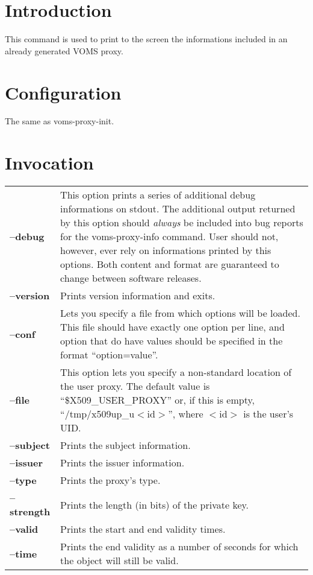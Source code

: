 \documentclass[a4paper]{book}
\begin{document}
\section{Introduction}
This command is used to print to the screen the informations included
in an already generated VOMS proxy.

\section{Configuration}
The same as voms-proxy-init.

\section{Invocation}
\begin{longtable}{lp{3in}}
\textbf{--debug}    & This option prints a series of additional debug
		      informations on stdout.  The additional output
		      returned by this option should \emph{always} be
		      included into bug reports for the
		      voms-proxy-info command.  User should not,
		      however, ever rely on informations printed by
		      this options.  Both content and format are
		      guaranteed to change between software
		      releases.\\
\textbf{--version}  & Prints version information and exits.\\
\textbf{--conf}     & Lets you specify a file from which options will
		      be loaded.  This file should have exactly one
		      option per line, and option that do have values
		      should be specified in the format
		      ``option=value''.\\ 
\textbf{--file}     & This option lets you specify a non-standard
		      location of the user proxy.  The default value
		      is ``\$X509\_USER\_PROXY'' or, if this is empty,
		      ``/tmp/x509up\_u$<$id$>$'', where $<$id$>$ is
		      the user's UID.\\
\textbf{--subject}  & Prints the subject information.\\
\textbf{--issuer}   & Prints the issuer information.\\
\textbf{--type}     & Prints the proxy's type.\\
\textbf{--strength} & Prints the length (in bits) of the private
		      key.\\
\textbf{--valid}    & Prints the start and end validity times.\\
\textbf{--time}     & Prints the end validity as a number of seconds
		      for which the object will still be valid.\\

\end{longtable}
\end{document}
